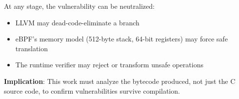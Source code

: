 \noindent
At any stage, the vulnerability can be neutralized:
\begin{itemize}
  \item LLVM may dead-code-eliminate a branch
  \item eBPF's memory model (512-byte stack, 64-bit registers) may force safe translation
  \item The runtime verifier may reject or transform unsafe operations
\end{itemize}

\noindent
\textbf{Implication}: This work must analyze the bytecode produced, not just the C source code, to confirm vulnerabilities survive compilation.
